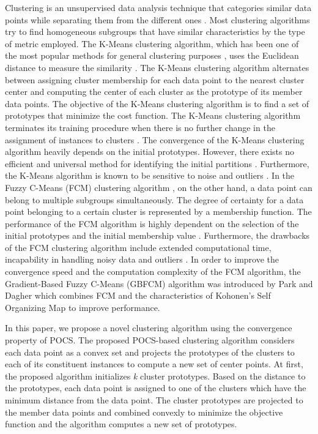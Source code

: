 \documentclass[conference]{IEEEtran}
\begin{document}
Clustering is an unsupervised data analysis technique that categories similar data points while separating them from the different ones \cite{b2}. Most clustering algorithms try to find homogeneous subgroups that have similar characteristics by the type of metric employed. The K-Means clustering algorithm, which has been one of the most popular methods for general clustering purposes \cite{b9}, uses the Euclidean distance to measure the similarity \cite{b2}. The K-Means clustering algorithm alternates between assigning cluster membership for each data point to the nearest cluster center and computing the center of each cluster as the prototype of its member data points. The objective of the K-Means clustering algorithm is to find a set of prototypes that minimize the cost function. The K-Means clustering algorithm terminates its training procedure when there is no further change in the assignment of instances to clusters \cite{b2}. The convergence of the K-Means clustering algorithm heavily depends on the initial prototypes. However, there exists no efficient and universal method for identifying the initial partitions \cite{b3}. Furthermore, the K-Means algorithm is known to be sensitive to noise and outliers \cite{b2}. In the Fuzzy C-Means (FCM) clustering algorithm \cite{b4}, on the other hand, a data point can belong to multiple subgroups simultaneously. The degree of certainty for a data point belonging to a certain cluster is represented by a membership function. The performance of the FCM algorithm is highly dependent on the selection of the initial prototypes and the initial membership value \cite{b4}. Furthermore, the drawbacks of the FCM clustering algorithm include extended computational time, incapability in handling noisy data and outliers \cite{b4}. In order to improve the convergence speed and the computation complexity of the FCM algorithm, the Gradient-Based Fuzzy C-Means (GBFCM) algorithm \cite{b5} was introduced by Park and Dagher which combines FCM and the characteristics of Kohonen’s Self Organizing Map \cite{b6} to improve performance.

In this paper, we propose a novel clustering algorithm using the convergence property of POCS. The proposed POCS-based clustering algorithm considers each data point as a convex set and projects the prototypes of the clusters to each of its constituent instances to compute a new set of center points. At first, the proposed algorithm initializes \textit{k} cluster prototypes. Based on the distance to the prototypes, each data point is assigned to one of the clusters which have the minimum distance from the data point. The cluster prototypes are projected to the member data points and combined convexly to minimize the objective function and the algorithm computes a new set of prototypes.
\end{document}
